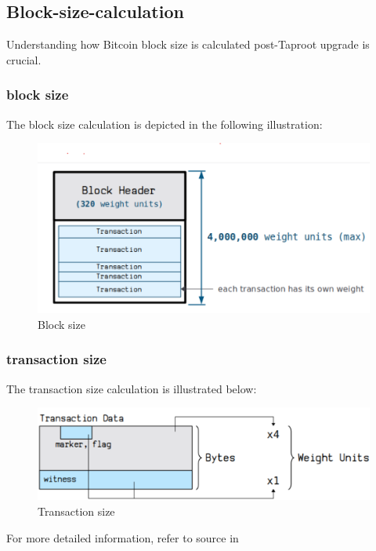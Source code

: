 \subsection{Block-size-calculation}

Understanding how Bitcoin block size is calculated post-Taproot upgrade is crucial.

\subsubsection{block size}

The block size calculation is depicted in the following illustration:

\begin{figure}[ht] 
    \centering  
    \includegraphics[width=0.85\columnwidth]{images/block-size.png} 
    \caption{Block size}
    \label{fig:block-size}
\end{figure}

\subsubsection{transaction size}

The transaction size calculation is illustrated below:

\begin{figure}[ht] 
    \centering  
    \includegraphics[width=0.85\columnwidth]{images/transaction-size.png} 
    \caption{Transaction size}
    \label{fig:transaction-size}
\end{figure}

For more detailed information, refer to source in \cite{website:transaction-size}

